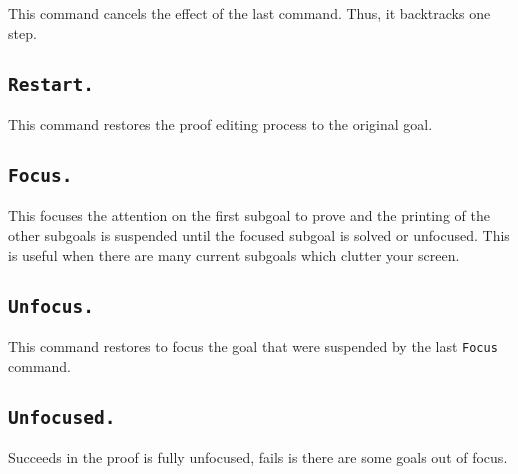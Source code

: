 This command cancels the effect of the last command.  Thus, it
backtracks one step.


\subsection[\tt Restart.]{\tt Restart.}
This command restores the proof editing process to the original goal.

\begin{ErrMsgs}
\item {}
\end{ErrMsgs}

\subsection[\tt Focus.]{\tt Focus.}
This focuses the attention on the first subgoal to prove and the printing
of the other subgoals is suspended until the focused subgoal is
solved or unfocused. This is useful when there are many current
subgoals which clutter your screen.


\subsection[\tt Unfocus.]{\tt Unfocus.}
This command restores to focus the goal that were suspended by the
last {\tt Focus} command.

\subsection[\tt Unfocused.]{\tt Unfocused.}
Succeeds in the proof is fully unfocused, fails is there are some
goals out of focus.

